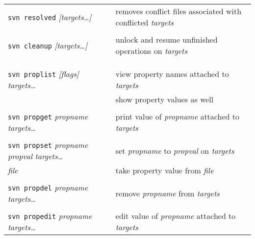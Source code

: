 \documentclass{report}
\begin{document}
\begin{tabular}{ll}
\\
{\tt svn resolved} {\sl [targets\dots]}	&
removes conflict files associated with conflicted {\sl targets}   \\

\\
{\tt svn cleanup} {\sl [targets\dots]}	&
unlock and resume unfinished operations on {\sl targets}   \\


\\
\\
\vspace{0.1in} \hspace{-0.1in}{\bf\Large Metadata}  \\

{\tt svn proplist} {\sl [flags]} {\sl targets\dots}    &
view property names attached to {\sl targets}     \\

\hspace{0.5in}{\tt -v}		&
show property values as well	 \\

\\
{\tt svn propget} {\sl propname} {\sl targets\dots}    &
print value of {\sl propname} attached to {\sl targets}     \\

\\
{\tt svn propset} {\sl propname} {\sl propval} {\sl targets\dots}    &
set {\sl propname} to {\sl propval} on {\sl targets}     \\

\hspace{0.5in}{\tt -F} {\sl file}		&
take property value from {\sl file}	 \\

\\
{\tt svn propdel} {\sl propname} {\sl targets\dots}    &
remove {\sl propname} from {\sl targets}     \\

\\
{\tt svn propedit} {\sl propname} {\sl targets\dots}    &
edit value of {\sl propname} attached to {\sl targets}     \\



\end{tabular}
\end{document}

